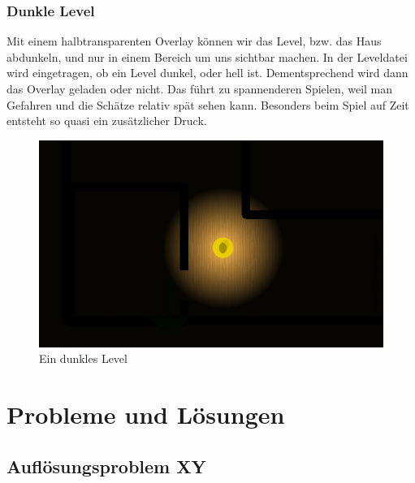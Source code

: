 \documentclass[12pt,a4paper]{scrartcl}
\begin{document}
\subsubsection{Dunkle Level}
Mit einem halbtransparenten Overlay können wir das Level, bzw. das Haus abdunkeln, und nur in einem Bereich um uns
sichtbar machen. In der Leveldatei wird eingetragen, ob ein Level dunkel, oder hell ist. Dementsprechend wird dann das
Overlay geladen oder nicht. Das führt zu spannenderen Spielen, weil man Gefahren und die Schätze relativ spät sehen kann.
Besonders beim Spiel auf Zeit entsteht so quasi ein zusätzlicher Druck.

\begin{figure}[h]
\centering
\includegraphics[scale=0.5]{img/dunkel.png}
\caption{Ein dunkles Level}
\end{figure}
\newpage


\section{Probleme und Lösungen}
\subsection{Auflösungsproblem XY}
\end{document}
